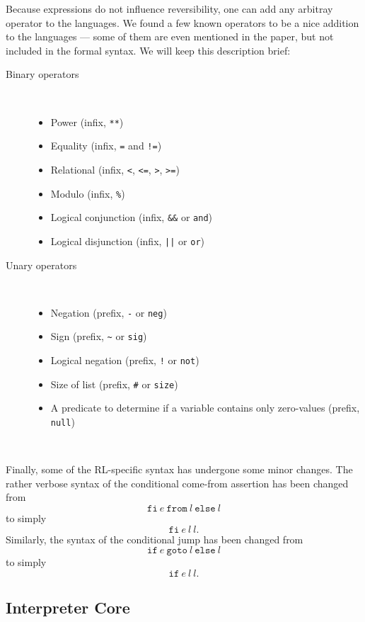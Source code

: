 \noindent Because expressions do not influence reversibility, one can add any arbitray operator to the languages. We found a few known operators to be a nice addition to the languages --- some of them are even mentioned in the paper, but not included in the formal syntax. We will keep this description brief:
\begin{description}
\item[Binary operators]~
  \begin{itemize}
  \item Power (infix, \texttt{**})
  \item Equality (infix, \texttt{=} and \texttt{!=})
  \item Relational (infix, \texttt{<}, \texttt{<=}, \texttt{>}, \texttt{>=})
  \item Modulo (infix, \texttt{\%})
  \item Logical conjunction (infix, \texttt{\&\&} or \texttt{and})
  \item Logical disjunction (infix, \texttt{||} or \texttt{or})
\end{itemize}
\item[Unary operators]~
\begin{itemize}
  \item Negation (prefix, \texttt{-} or \texttt{neg})
  \item Sign (prefix, \texttt{\~} or \texttt{sig})
  \item Logical negation (prefix, \texttt{!} or \texttt{not})
  \item Size of list (prefix, \texttt{\#} or \texttt{size})
  \item A predicate to determine if a variable contains only zero-values (prefix, \texttt{null})
\end{itemize}
\end{description}~

\noindent Finally, some of the RL-specific syntax has undergone some minor changes. The rather verbose syntax of the conditional come-from assertion has been changed from
\[\texttt{fi} \ e \ \texttt{from} \ l \ \texttt{else} \ l\]
\noindent to simply
\[\texttt{fi} \ e \ l \ l.\]
\noindent Similarly, the syntax of the conditional jump has been changed from
\[\texttt{if} \ e \ \texttt{goto} \ l \ \texttt{else} \ l\]
\noindent to simply
\[\texttt{if} \ e \ l \ l.\]

\subsection{Interpreter Core}

